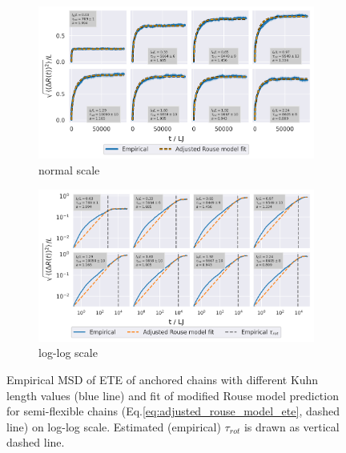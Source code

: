 \documentclass[
    paper=A4,pagesize=automedia,fontsize=12pt,
    BCOR=15mm,DIV=22,
    twoside,headinclude,footinclude=false,
    fleqn,             %
    bibliography=totocnumbered,          %
    listof=totoc,                %
    listof=flat,                 %
    cleardoublepage=empty      %
    numbers=endperiod
]{scrartcl}
\begin{document}
\begin{figure}
    \centering
    \begin{subfigure}[b]{\textwidth}
        \centering
        \includegraphics[width=\textwidth]{4-exp-delta_R-rouse_fit-tau-a.png}
        \caption{normal scale}
        \label{fig:msd_anchored_l_K_rouse_fit_tau-a_normal}
    \end{subfigure}
    \begin{subfigure}[b]{\textwidth}
        \centering
        \includegraphics[width=\textwidth]{4-exp-delta_R-rouse_fit-tau-a_log.png}
        \caption{log-log scale}
        \label{fig:msd_anchored_l_K_rouse_fit_tau-a_log}
    \end{subfigure}
    \caption{Empirical MSD of ETE of anchored chains with different Kuhn length values (blue line)
    and fit of modified Rouse model prediction for semi-flexible chains 
    (Eq.\ref{eq:adjusted_rouse_model_ete}, dashed line) on log-log scale.
    Estimated (empirical) $\tau_{rot}$ is drawn as vertical dashed line.}
    \label{fig:msd_anchored_l_K_rouse_fit_tau-a}
\end{figure}
\end{document}
